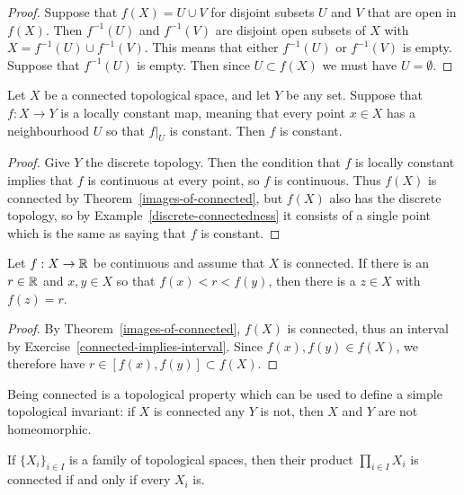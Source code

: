 \begin{proof}
  Suppose that $f(X) = U \cup V$ for disjoint subsets $U$ and $V$ that are open in $f(X)$. Then $f^{-1}(U)$ and $f^{-1}(V)$ are disjoint open subsets of $X$ with $X = f^{-1}(U) \cup f^{-1}(V)$. This means that either $f^{-1}(U)$ or $f^{-1}(V)$ is empty. Suppose that $f^{-1}(U)$ is empty. Then since $U \subset f(X)$ we must have $U = \emptyset$.
\end{proof}
\begin{cor}
  Let $X$ be a connected topological space, and let $Y$ be any set. Suppose that $f : X \to Y$ is a locally constant map, meaning that every point $x \in X$ has a neighbourhood $U$ so that $f|_U$ is constant. Then $f$ is constant.
\end{cor}
\begin{proof}
  Give $Y$ the discrete topology. Then the condition that $f$ is locally constant implies that $f$ is continuous at every point, so $f$ is continuous. Thus $f(X)$ is connected by Theorem~\ref{images-of-connected}, but $f(X)$ also has the discrete topology, so by Example~\ref{discrete-connectedness} it consists of a single point which is the same as saying that $f$ is constant.
\end{proof}
\begin{cor}
  Let $f : X \to \mathbb{R}$ be continuous and assume that $X$ is connected. If there is an $r \in \mathbb{R}$ and $x,y \in X$ so that $f(x) < r < f(y)$, then there is a $z \in X$ with $f(z) = r$.
\end{cor}
\begin{proof}
  By Theorem~\ref{images-of-connected}, $f(X)$ is connected, thus an interval by Exercise~\ref{connected-implies-interval}. Since $f(x),f(y) \in f(X)$, we therefore have $r \in [f(x),f(y)] \subset f(X)$.
\end{proof}
\begin{rem}
  Being connected is a topological property which can be used to define a simple topological invariant: if $X$ is connected any $Y$ is not, then $X$ and $Y$ are not homeomorphic.
\end{rem}
\begin{thm}
  \label{products-connected}
  If $\{X_i\}_{i \in I}$ is a family of topological spaces, then their product $\prod_{i \in I} X_i$ is connected if and only if every $X_i$ is.
\end{thm}
